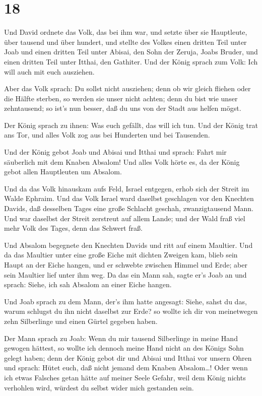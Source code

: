 \hypertarget{section-17}{%
\section{18}\label{section-17}}

 Und David ordnete das Volk, das bei ihm war, und setzte
über sie Hauptleute, über tausend und über hundert,  und
stellte des Volkes einen dritten Teil unter Joab und einen dritten Teil
unter Abisai, den Sohn der Zeruja, Joabs Bruder, und einen dritten Teil
unter Itthai, den Gathiter. Und der König sprach zum Volk: Ich will auch
mit euch ausziehen.

 Aber das Volk sprach: Du sollst nicht ausziehen; denn ob
wir gleich fliehen oder die Hälfte sterben, so werden sie unser nicht
achten; denn du bist wie unser zehntausend; so ist's nun besser, daß du
uns von der Stadt aus helfen mögst.

 Der König sprach zu ihnen: Was euch gefällt, das will ich
tun. Und der König trat ans Tor, und alles Volk zog aus bei Hunderten
und bei Tausenden.

 Und der König gebot Joab und Abisai und Itthai und sprach:
Fahrt mir säuberlich mit dem Knaben Absalom! Und alles Volk hörte es, da
der König gebot allen Hauptleuten um Absalom.

 Und da das Volk hinauskam aufs Feld, Israel entgegen, erhob
sich der Streit im Walde Ephraim.  Und das Volk Israel ward
daselbst geschlagen vor den Knechten Davids, daß desselben Tages eine
große Schlacht geschah, zwanzigtausend Mann.  Und war
daselbst der Streit zerstreut auf allem Lande; und der Wald fraß viel
mehr Volk des Tages, denn das Schwert fraß.

 Und Absalom begegnete den Knechten Davids und ritt auf
einem Maultier. Und da das Maultier unter eine große Eiche mit dichten
Zweigen kam, blieb sein Haupt an der Eiche hangen, und er schwebte
zwischen Himmel und Erde; aber sein Maultier lief unter ihm weg.
 Da das ein Mann sah, sagte er's Joab an und sprach: Siehe,
ich sah Absalom an einer Eiche hangen.

 Und Joab sprach zu dem Mann, der's ihm hatte angesagt:
Siehe, sahst du das, warum schlugst du ihn nicht daselbst zur Erde? so
wollte ich dir von meinetwegen zehn Silberlinge und einen Gürtel gegeben
haben.

 Der Mann sprach zu Joab: Wenn du mir tausend Silberlinge
in meine Hand gewogen hättest, so wollte ich dennoch meine Hand nicht an
des Königs Sohn gelegt haben; denn der König gebot dir und Abisai und
Itthai vor unsern Ohren und sprach: Hütet euch, daß nicht jemand dem
Knaben Absalom\ldots!  Oder wenn ich etwas Falsches getan
hätte auf meiner Seele Gefahr, weil dem König nichts verhohlen wird,
würdest du selbst wider mich gestanden sein.


